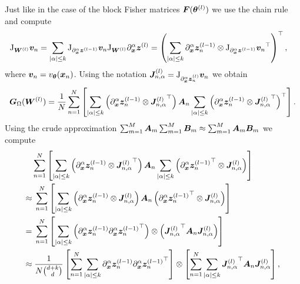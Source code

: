 Just like in the case of the block Fisher matrices ${\bm{F}}({\bm{\theta}}^{(l)})$ we use the chain rule and compute
\begin{align*}
    \mathrm{J}_{{\bm{W}}^{(l)}} {\bm{v}}_n & = \sum_{\lvert \alpha \rvert\le k}\mathrm{J}_{\partial_{\bm{x}}^\alpha {\bm{z}}^{(l-1)}}{\bm{v}}_n \mathrm{J}_{{\bm{W}}^{(l)}} \partial_{\bm{x}}^\alpha {\bm{z}}^{(l)} =
    \left(\sum_{\lvert \alpha \rvert\le k} \partial_{\bm{x}}^\alpha {\bm{z}}^{(l-1)}_n \otimes {\mathrm{J}_{\partial_{\bm{x}}^\alpha {\bm{z}}^{(l-1)}} {\bm{v}}_n}^\top\right)^\top,
\end{align*}
where ${\bm{v}}_n = v_{\bm{\theta}}({\bm{x}}_n)$.
Using the notation ${\bm{J}}^{(l)}_{n,\alpha} = \mathrm{J}_{\partial_{\bm{x}}^\alpha {\bm{z}}_n^{(l)}} {\bm{v}}_n$ we obtain
\begin{equation}\label{eq:laplace_gramian_block_exact}
    {\bm{G}}_\Omega({\bm{W}}^{(l)})
    =
    \frac1N\sum_{n=1}^N
    \left[\sum_{\lvert \alpha \rvert\le k} \left( \partial_{\bm{x}}^\alpha {\bm{z}}^{(l-1)}_n \otimes {{\bm{J}}_{n,\alpha}^{(l)}}^\top \right)
    {\bm{A}}_n
    \sum_{\lvert \alpha \rvert\le k} \left( \partial_{\bm{x}}^\alpha {\bm{z}}^{(l-1)}_n \otimes {{\bm{J}}_{n,\alpha}^{(l)}}^\top \right)^\top\right].
\end{equation}
Using the crude approximation $\sum_{m=1}^M {\bm{A}}_m\sum_{m=1}^M {\bm{B}}_m \approx \sum_{m=1}^M {\bm{A}}_m {\bm{B}}_m$ we compute
\begin{align}
    \begin{split}
        & \sum_{n=1}^N
    \left[\sum_{\lvert \alpha \rvert\le k} \left( \partial_{\bm{x}}^\alpha {\bm{z}}^{(l-1)}_n\otimes {{\bm{J}}_{n,\alpha}^{(l)}}^\top \right)
    {\bm{A}}_n
    \sum_{\lvert \alpha \rvert\le k} \left( \partial_{\bm{x}}^\alpha {{\bm{z}}^{(l-1)}_n}^\top\otimes {\bm{J}}_{n,\alpha}^{(l)} \right)\right]
    \\ \approx & \;
    \sum_{n=1}^N
    \left[\sum_{\lvert \alpha \rvert\le k} \left( \partial_{\bm{x}}^\alpha {\bm{z}}^{(l-1)}_n \otimes {\bm{J}}_{n,\alpha}^{(l)} \right)
    {\bm{A}}_n
    \left( \partial_{\bm{x}}^\alpha {{\bm{z}}^{(l-1)}_n}^\top \otimes {\bm{J}}_{n,\alpha}^{(l)} \right)\right]
    \\ = & \;
    \sum_{n=1}^N
    \left[\sum_{\lvert \alpha \rvert\le k} \left( \partial_{\bm{x}}^\alpha {\bm{z}}^{(l-1)}_n{\partial_{\bm{x}}^\alpha {\bm{z}}^{(l-1)}_n}^\top\right) \otimes \left({{\bm{J}}_{n,\alpha}^{(l)}}^\top {\bm{A}}_n{{\bm{J}}_{n,\alpha}^{(l)}}\right)
    \right]
    \\ \approx & \;
    \frac{1}{N\binom{d+k}{d} }\left[\sum_{n=1}^N \sum_{\lvert \alpha \rvert\le k} \partial_{\bm{x}}^\alpha {\bm{z}}^{(l-1)}_n{\partial_{\bm{x}}^\alpha {\bm{z}}^{(l-1)}_n}^\top \right]
    \otimes
    \left[\sum_{n=1}^N\sum_{\lvert \alpha \rvert\le k} {{\bm{J}}^{(l)}_{n,\alpha}}^\top{\bm{A}}_n{{\bm{J}}^{(l)}_{n,\alpha}} \right],
    \end{split}
\end{align}
